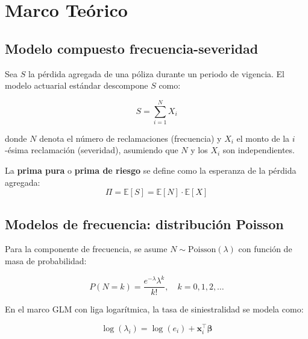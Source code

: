 
\section{Marco Teórico}
\label{sec:marco}

\subsection{Modelo compuesto frecuencia-severidad}

Sea $S$ la pérdida agregada de una póliza durante un periodo de vigencia. El modelo actuarial estándar descompone $S$ como:

\begin{equation}
  S = \sum_{i=1}^{N} X_i
  \label{eq:modelo_compuesto}
\end{equation}

donde $N$ denota el número de reclamaciones (frecuencia) y $X_i$ el monto de la $i$-ésima reclamación (severidad), asumiendo que $N$ y los $X_i$ son independientes.

\begin{definition}
La \textbf{prima pura} o \textbf{prima de riesgo} se define como la esperanza de la pérdida agregada:
\begin{equation}
  \Pi = \mathbb{E}[S] = \mathbb{E}[N] \cdot \mathbb{E}[X]
  \label{eq:prima_pura}
\end{equation}
\end{definition}

\subsection{Modelos de frecuencia: distribución Poisson}

Para la componente de frecuencia, se asume $N \sim \text{Poisson}(\lambda)$ con función de masa de probabilidad:

\begin{equation}
  P(N = k) = \frac{e^{-\lambda} \lambda^k}{k!}, \quad k = 0, 1, 2, \ldots
\end{equation}

En el marco GLM con liga logarítmica, la tasa de siniestralidad se modela como:

\begin{equation}
  \log(\lambda_i) = \log(e_i) + \boldsymbol{x}_i^\top \boldsymbol{\beta}
\end{equation}


